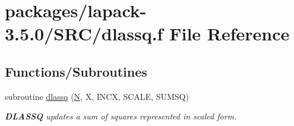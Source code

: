 \hypertarget{dlassq_8f}{}\section{packages/lapack-\/3.5.0/\+S\+R\+C/dlassq.f File Reference}
\label{dlassq_8f}
\subsection*{Functions/\+Subroutines}
\begin{DoxyCompactItemize}
\item 
subroutine \hyperlink{group__auxOTHERauxiliary_ga9c824016058563e3b7189801d1de6d58}{dlassq} (\hyperlink{polmisc_8c_a0240ac851181b84ac374872dc5434ee4}{N}, X, I\+N\+C\+X, S\+C\+A\+L\+E, S\+U\+M\+S\+Q)
\begin{DoxyCompactList}\small\item\em {\bfseries D\+L\+A\+S\+S\+Q} updates a sum of squares represented in scaled form. \end{DoxyCompactList}\end{DoxyCompactItemize}
